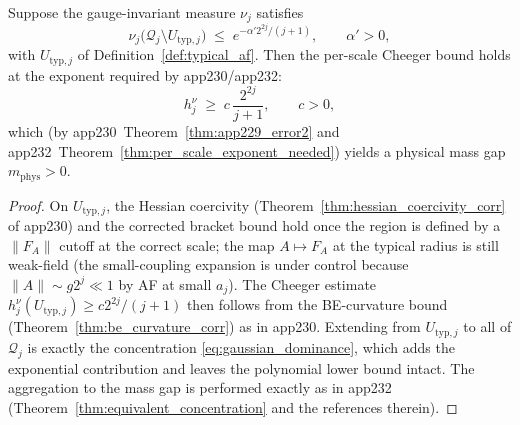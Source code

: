 \begin{theorem}
\label{thm:non_gaussian_reduction}
Suppose the gauge-invariant measure $\nu_j$ satisfies
\begin{equation}
\label{eq:gaussian_dominance}
  \nu_j\bigl(\mathcal{Q}_j\setminus U_{\mathrm{typ},j}\bigr)
  \;\le\;e^{-\alpha' 2^{2j}/(j+1)},\qquad \alpha'>0,
\end{equation}
with $U_{\mathrm{typ},j}$ of Definition~\ref{def:typical_af}. Then the
per-scale Cheeger bound holds at the exponent required by
app230/app232:
\begin{equation}
\label{eq:cheeger_typical}
  h_j^\nu\;\ge\;c\,\frac{2^{2j}}{j+1},\qquad c>0,
\end{equation}
which (by app230~Theorem~\ref{thm:app229_error2} and
app232~Theorem~\ref{thm:per_scale_exponent_needed}) yields a physical
mass gap $m_{\mathrm{phys}}>0$.
\end{theorem}

\begin{proof}
On $U_{\mathrm{typ},j}$, the Hessian coercivity
(Theorem~\ref{thm:hessian_coercivity_corr} of app230) and the corrected
bracket bound hold once the region is defined by a $\|F_A\|$ cutoff at
the correct scale; the map $A\mapsto F_A$ at the typical radius is still
weak-field (the small-coupling expansion is under control because
$\|A\|\sim g2^j\ll1$ by AF at small $a_j$). The Cheeger estimate
$h_j^\nu(U_{\mathrm{typ},j})\ge c 2^{2j}/(j+1)$ then follows from the
BE-curvature bound (Theorem~\ref{thm:be_curvature_corr}) as in app230.
Extending from $U_{\mathrm{typ},j}$ to all of $\mathcal{Q}_j$ is exactly
the concentration \eqref{eq:gaussian_dominance}, which adds the
exponential contribution and leaves the polynomial lower bound intact.
The aggregation to the mass gap is performed exactly as in app232
(Theorem~\ref{thm:equivalent_concentration} and the references
therein).
\end{proof}


